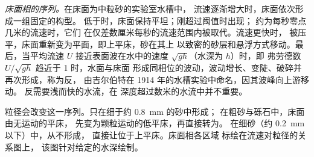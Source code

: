 \emph{床面相的序列。}在床面为中粒砂的实验室水槽中，
流速逐渐增大时，床面依次形成一组固定的构型。
低于时，床面保持平坦；刚超过阈值时出现；
约为每秒零点几米的流速时，它们
在仅差数厘米每秒的流速范围内被取代。流速更快时，
被压平，床面重新变为平面，即上平床，砂在其上
以致密的砂层和悬浮方式移动。最后，当平均流速 $U$
接近表面波在水中的速度 $\sqrt{gh}$（水深为 $h$）时，即
弗劳德数 $U/\sqrt{gh}$ 趋近于 1 时，水面与床面
形成同相位的波动，波动增长、变陡、破碎并再次形成，称为反，
由吉尔伯特在 1914 年的水槽实验中命名，因其波峰向上游移动。
反需要浅而快的水流，在
深度超过数米的水流中并不重要。

粒径会改变这一序列。只在细于约 \qty{0.8}{mm} 的砂中形成；
在粗砂与砾石中，床面由无运动的平床，
先变为颗粒运动的低平床，再直接转为。
在细砂（约 \qty{0.2}{mm} 以下）中，从不形成，
直接让位于上平床。床面相各区域
标绘在流速对粒径的关系图上，
该图针对给定的水深绘制。

